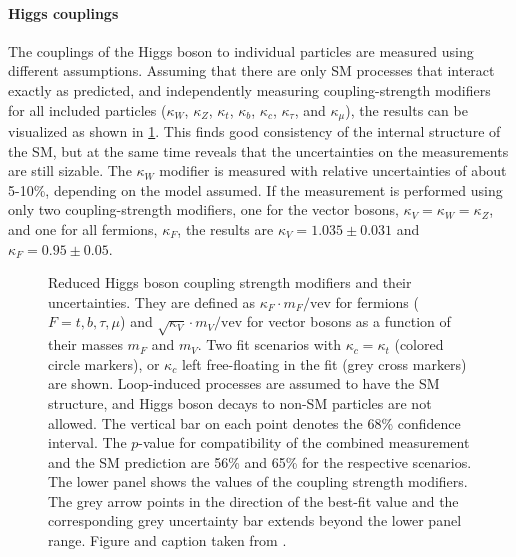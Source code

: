 \paragraph{Higgs couplings}
The couplings of the Higgs boson to individual particles are measured using different assumptions.
Assuming that there are only SM processes that interact exactly as predicted, and independently measuring coupling-strength modifiers for all included particles ($\kappa_W$, $\kappa_Z$, $\kappa_t$, $\kappa_b$, $\kappa_c$, $\kappa_\tau$, and $\kappa_\mu$), the results can be visualized as shown in \cref{fig:h-couplings}. 
This finds good consistency of the internal structure of the SM, but at the same time reveals that the uncertainties on the measurements are still sizable. 
The $\kappa_W$ modifier is measured with relative uncertainties of about 5-10\%, depending on the model assumed. 
If the measurement is performed using only two coupling-strength modifiers, one for the vector bosons, $\kappa_V = \kappa_W = \kappa_Z$, and one for all fermions, $\kappa_F$, the results are $\kappa_V = 1.035 \pm 0.031$ and $\kappa_F = 0.95 \pm 0.05$. 

\begin{figure}
  \caption{
    Reduced Higgs boson coupling strength modifiers and their uncertainties. They are defined as $\kappa_F \cdot m_F / \text{vev}$ for fermions
($F=t,b,\tau,\mu$) and $\sqrt{\kappa_V}\cdot m_V/\text{vev}$ for vector bosons as a
function of their masses $m_F$ and $m_V$. Two fit scenarios with $\kappa_c =
\kappa_t$ (colored circle markers), or $\kappa_c$ left free-floating in the fit (grey
cross markers) are shown. Loop-induced processes are assumed to have the SM structure, and Higgs boson decays to non-SM particles are not allowed. The vertical bar on each point denotes the 68\% confidence interval. The $p$-value for compatibility of the combined measurement and the SM prediction are 56\% and 65\% for the respective scenarios. The lower panel shows the values of the coupling strength modifiers. The grey arrow points in the direction of the best-fit value and the corresponding grey uncertainty bar extends beyond the lower panel range. Figure and caption taken from .}
  \label{fig:h-couplings}
\end{figure}

